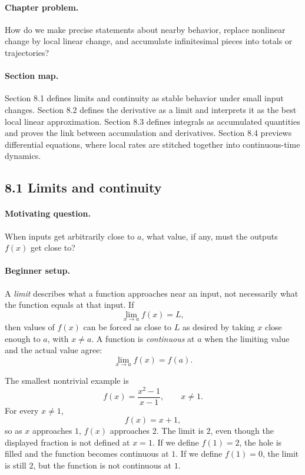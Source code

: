 \paragraph{Chapter problem.}
How do we make precise statements about nearby behavior, replace nonlinear change by local linear change, and accumulate infinitesimal pieces into totals or trajectories?

\paragraph{Section map.}
Section 8.1 defines limits and continuity as stable behavior under small input changes. Section 8.2 defines the derivative as a limit and interprets it as the best local linear approximation. Section 8.3 defines integrals as accumulated quantities and proves the link between accumulation and derivatives. Section 8.4 previews differential equations, where local rates are stitched together into continuous-time dynamics.

\subsection{8.1 Limits and continuity}

\paragraph{Motivating question.}
When inputs get arbitrarily close to \(a\), what value, if any, must the outputs \(f(x)\) get close to?

\paragraph{Beginner setup.}
A \emph{limit} describes what a function approaches near an input, not necessarily what the function equals at that input. If
\[
\lim_{x\to a} f(x)=L,
\]
then values of \(f(x)\) can be forced as close to \(L\) as desired by taking \(x\) close enough to \(a\), with \(x\neq a\). A function is \emph{continuous} at \(a\) when the limiting value and the actual value agree:
\[
\lim_{x\to a}f(x)=f(a).
\]

The smallest nontrivial example is
\[
f(x)=\frac{x^2-1}{x-1},\qquad x\neq 1.
\]
For every \(x\neq 1\),
\[
f(x)=x+1,
\]
so as \(x\) approaches \(1\), \(f(x)\) approaches \(2\). The limit is \(2\), even though the displayed fraction is not defined at \(x=1\). If we define \(f(1)=2\), the hole is filled and the function becomes continuous at \(1\). If we define \(f(1)=0\), the limit is still \(2\), but the function is not continuous at \(1\).

